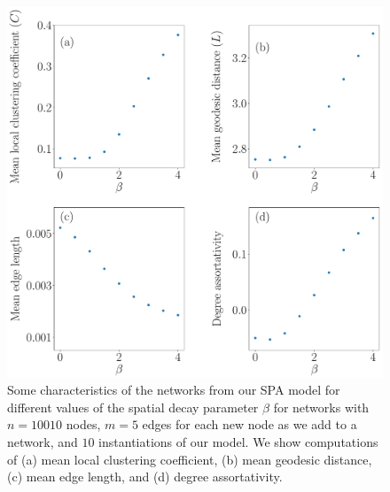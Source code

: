 \documentclass[%
 reprint,
 amsmath,amssymb,
 aps,
]{revtex4-1}
\begin{document}
\begin{figure}
    \centering
    \includegraphics[width=1.0\linewidth]{preferential_attachment_metrics.pdf}
    \caption{Some characteristics of the networks from our SPA model for different values of the spatial decay parameter $\beta$ for networks with $n=10010$ nodes, $m=5$ edges for each new node as we add to a network, and $10$ instantiations of our model. We show computations of (a) mean local clustering coefficient, (b) mean geodesic distance, (c) mean edge length, and (d) degree assortativity.
    }
\end{figure}
\end{document}
